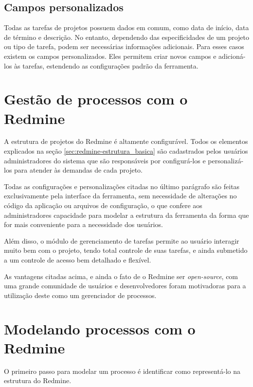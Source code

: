 \subsection{Campos personalizados}\label{subsection:redmine-estrutura_basica-custom_fields}

Todas as tarefas de projetos possuem dados em comum, como data de início, data de término e descrição. No entanto, dependendo das especificidades de um projeto ou tipo de tarefa, podem ser necessárias informações adicionais. Para esses casos existem os campos personalizados. Eles permitem criar novos campos e adicioná-los às tarefas, estendendo as configurações padrão da ferramenta.

\section{Gestão de processos com o Redmine}\label{sec:redmine-gestao_processos}

A estrutura de projetos do Redmine é altamente configurável. Todos os elementos explicados na seção \ref{sec:redmine-estrutura_basica} são cadastrados pelos usuários administradores do sistema que são responsáveis por configurá-los e personalizá-los para atender às demandas de cada projeto.

Todas as configurações e personalizações citadas no último parágrafo são feitas exclusivamente pela interface da ferramenta, sem necessidade de alterações no código da aplicação ou arquivos de configuração, o que confere aos administradores capacidade para modelar a estrutura da ferramenta da forma que for mais conveniente para a necessidade dos usuários.

Além disso, o módulo de gerenciamento de tarefas permite ao usuário interagir muito bem com o projeto, tendo total controle de suas tarefas, e ainda submetido a um controle de acesso bem detalhado e flexível.

As vantagens citadas acima, e ainda o fato de o Redmine ser \textit{open-source}, com uma grande comunidade de usuários e desenvolvedores foram motivadoras para a utilização deste como um gerenciador de processos.

\section{Modelando processos com o Redmine}\label{sec:redmine-automatizar_processo}

O primeiro passo para modelar um processo é identificar como representá-lo na estrutura do Redmine.


